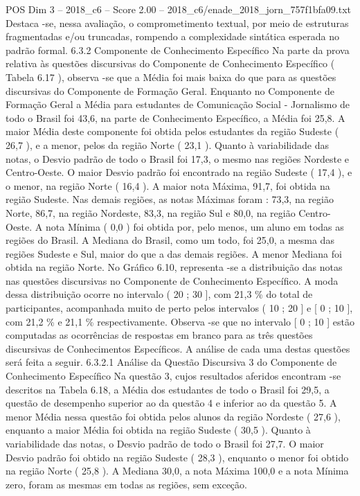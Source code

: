 \begin{textsample}{POS Dim 3 – 2018\_c6 – Score 2.00 – 2018\_c6/enade\_2018\_jorn\_757f1bfa09.txt}
Destaca -se, nessa avaliação, o comprometimento textual, por meio de estruturas fragmentadas e/ou truncadas, rompendo a complexidade sintática esperada no padrão formal. 6.3.2 Componente de Conhecimento Específico Na parte da prova relativa às questões discursivas do Componente de Conhecimento Específico ( Tabela 6.17 ), observa -se que a Média foi mais baixa do que para as questões discursivas do Componente de Formação Geral.
Enquanto no Componente de Formação Geral a Média para estudantes de Comunicação Social - Jornalismo de todo o Brasil foi 43,6, na parte de Conhecimento Específico, a Média foi 25,8.
A maior Média deste componente foi obtida pelos estudantes da região Sudeste ( 26,7 ), e a menor, pelos da região Norte ( 23,1 ).
Quanto à variabilidade das notas, o Desvio padrão de todo o Brasil foi 17,3, o mesmo nas regiões Nordeste e Centro-Oeste.
O maior Desvio padrão foi encontrado na região Sudeste ( 17,4 ), e o menor, na região Norte ( 16,4 ).
A maior nota Máxima, 91,7, foi obtida na região Sudeste.
Nas demais regiões, as notas Máximas foram : 73,3, na região Norte, 86,7, na região Nordeste, 83,3, na região Sul e 80,0, na região Centro-Oeste.
A nota Mínima ( 0,0 ) foi obtida por, pelo menos, um aluno em todas as regiões do Brasil.
A Mediana do Brasil, como um todo, foi 25,0, a mesma das regiões Sudeste e Sul, maior do que a das demais regiões.
A menor Mediana foi obtida na região Norte.
No Gráfico 6.10, representa -se a distribuição das notas nas questões discursivas no Componente de Conhecimento Específico.
A moda dessa distribuição ocorre no intervalo ( 20 ; 30 ], com 21,3 \% do total de participantes, acompanhada muito de perto pelos intervalos ( 10 ; 20 ] e [ 0 ; 10 ], com 21,2 \% e 21,1 \% respectivamente.
Observa -se que no intervalo [ 0 ; 10 ] estão computadas as ocorrências de respostas em branco para as três questões discursivas de Conhecimentos Específicos.
A análise de cada uma destas questões será feita a seguir. 6.3.2.1 Análise da Questão Discursiva 3 do Componente de Conhecimento Específico Na questão 3, cujos resultados aferidos encontram -se descritos na Tabela 6.18, a Média dos estudantes de todo o Brasil foi 29,5, a questão de desempenho superior ao da questão 4 e inferior ao da questão 5.
A menor Média nessa questão foi obtida pelos alunos da região Nordeste ( 27,6 ), enquanto a maior Média foi obtida na região Sudeste ( 30,5 ).
Quanto à variabilidade das notas, o Desvio padrão de todo o Brasil foi 27,7.
O maior Desvio padrão foi obtido na região Sudeste ( 28,3 ), enquanto o menor foi obtido na região Norte ( 25,8 ).
A Mediana 30,0, a nota Máxima 100,0 e a nota Mínima zero, foram as mesmas em todas as regiões, sem exceção.

\end{textsample}
